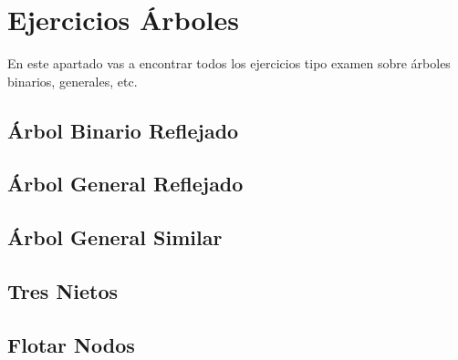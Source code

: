 \chapter{Ejercicios Árboles}
En este apartado vas a encontrar todos los ejercicios tipo examen sobre árboles binarios, generales, etc.


\section*{Árbol Binario Reflejado}
{}
\label{sec:EjerciciosArboles1}


\newpage
\section*{Árbol General Reflejado}
{}
\label{sec:EjerciciosArboles2}


\newpage
\section*{Árbol General Similar}
{}
\label{sec:EjerciciosArboles3}


\newpage
\section*{Tres Nietos}
{}
\label{sec:EjerciciosArboles4}


\newpage
\section*{Flotar Nodos}
{}
\label{sec:EjerciciosArboles5}


